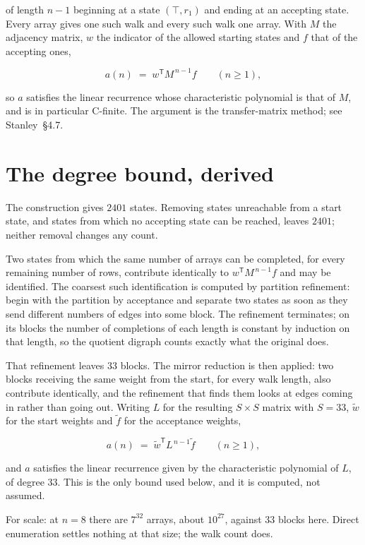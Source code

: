 \documentclass[11pt]{article}
\theoremstyle{definition}
\begin{document}
of length $n-1$ beginning at a state $(\top,r_1)$ and ending at an accepting state. Every array gives one such walk and every such walk one array. With $M$ the adjacency matrix, $w$ the indicator of the allowed starting states and $f$ that of the accepting ones,

\[a(n) \;=\; w^{\mathsf T} M^{\,n-1} f \qquad (n \ge 1),\]

so $a$ satisfies the linear recurrence whose characteristic polynomial is that of $M$, and is in particular C-finite. The argument is the transfer-matrix method; see Stanley~\S4.7.

\section{The degree bound, derived}

The construction gives $2401$ states. Removing states unreachable from a start state, and states from which no accepting state can be reached, leaves $2401$; neither removal changes any count.

Two states from which the same number of arrays can be completed, for every remaining number of rows, contribute identically to $w^{\mathsf T}M^{\,n-1}f$ and may be identified. The coarsest such identification is computed by partition refinement: begin with the partition by acceptance and separate two states as soon as they send different numbers of edges into some block. The refinement terminates; on its blocks the number of completions of each length is constant by induction on that length, so the quotient digraph counts exactly what the original does.

That refinement leaves $33$ blocks. The mirror reduction is then applied: two blocks receiving the same weight from the start, for every walk length, also contribute identically, and the refinement that finds them looks at edges coming in rather than going out. Writing $L$ for the resulting $S \times S$ matrix with $S = 33$, $\tilde w$ for the start weights and $\tilde f$ for the acceptance weights,

\[a(n) \;=\; \tilde w^{\mathsf T} L^{\,n-1} \tilde f \qquad (n \ge 1),\]

and $a$ satisfies the linear recurrence given by the characteristic polynomial of $L$, of degree $33$. This is the only bound used below, and it is computed, not assumed.

For scale: at $n = 8$ there are $7^{32}$ arrays, about $10^{27}$, against $33$ blocks here. Direct enumeration settles nothing at that size; the walk count does.
\end{document}
